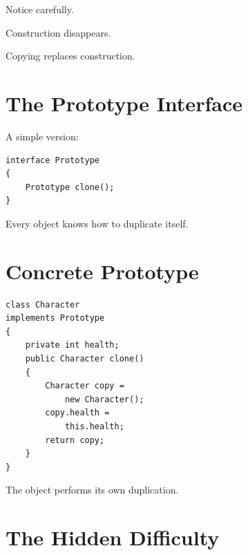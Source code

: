 \documentclass[11pt,a4paper]{book}
\begin{document}
Notice carefully.


Construction disappears.


Copying replaces construction.


\section{The Prototype Interface}

A simple version:

\begin{verbatim}
interface Prototype
{
    Prototype clone();
}
\end{verbatim}


Every object knows how
to duplicate itself.


\section{Concrete Prototype}

\begin{verbatim}
class Character
implements Prototype
{
    private int health;
    public Character clone()
    {
        Character copy =
            new Character();
        copy.health =
            this.health;
        return copy;
    }
}
\end{verbatim}


The object performs its own
duplication.


\section{The Hidden Difficulty}
\end{document}
